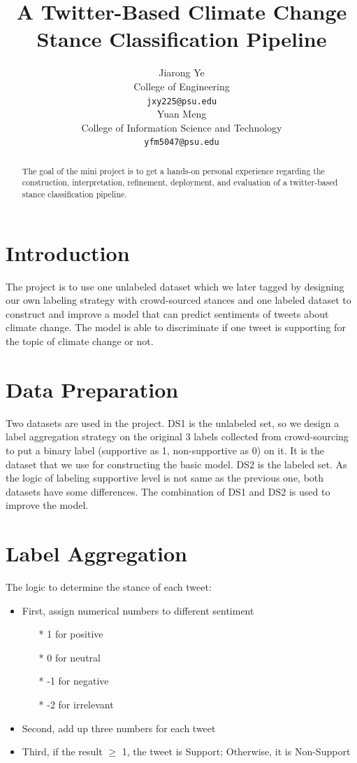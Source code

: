 \documentclass{article} %
\title{A Twitter-Based Climate Change Stance Classification Pipeline}
\author{
Jiarong Ye\\
College of Engineering\\
\texttt{jxy225@psu.edu} \\
\And
Yuan Meng\\
College of Information Science and Technology\\
\texttt{yfm5047@psu.edu} \\
}
\begin{document}
\maketitle

\begin{abstract}
The goal of the mini project is to get a hands-on personal experience regarding the construction, interpretation, refinement, deployment, and evaluation of a twitter-based stance classification pipeline.
\end{abstract}

\section{Introduction}

The project is to use one unlabeled dataset which we later tagged by designing our own labeling strategy with crowd-sourced stances and one labeled dataset to construct and improve a model that can predict sentiments of tweets about climate change. The model is able to discriminate if one tweet is supporting for the topic of climate change or not. 

\section{Data Preparation}

Two datasets are used in the project. DS1 is the unlabeled set, so we design a label aggregation strategy on the original 3 labels collected from crowd-sourcing to put a binary label (supportive as 1, non-supportive as 0) on it. It is the dataset that we use for constructing the basic model. DS2 is the labeled set. As the logic of labeling supportive level is not same as the previous one, both datasets have some differences. The combination of DS1 and DS2 is used to improve the model.


\section{Label Aggregation}

The logic to determine the stance of each tweet: 

\begin{itemize}
	\item  First, assign numerical numbers to  different sentiment
	\begin{itemize}
		\item[*] 1 for positive
		\item[*] 0 for neutral
		\item[*] -1 for negative
		\item[*] -2 for irrelevant
	\end{itemize}
	\item  Second, add up three numbers for each tweet
	\item  Third, if the result $\ge$ 1, the tweet is Support; Otherwise, it is Non-Support
\end{itemize}
\end{document}
